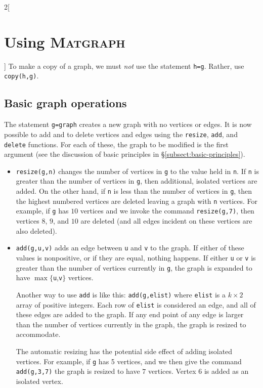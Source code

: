 \documentclass{amsart}
\newcommand\matgraph{\textsc{Matgraph}}
\begin{document}
\begin{multicols}{2}[\section{Using \matgraph}]
To make a copy of a graph, we must \emph{not} use the statement
\verb|h=g|. Rather, use \verb|copy(h,g)|. 




\subsection{Basic graph operations}

The statement \verb|g=graph| creates a new graph with no vertices or
edges. It is now possible to add and to delete vertices and edges
using the \verb|resize|, \verb|add|, and \verb|delete| functions.  For
each of these, the graph to be modified is the first argument (see the
discussion of basic principles in \S\ref{subsect:basic-principles}).

\begin{itemize}
\item \verb|resize(g,n)| changes the number of vertices in \verb|g| to
  the value held in \verb|n|. If \verb|n| is greater than the number
  of vertices in \verb|g|, then additional, isolated vertices are
  added. On the other hand, if \verb|n| is less than the number of
  vertices in \verb|g|, then the highest numbered vertices are deleted
  leaving a graph with \verb|n| vertices. For example, if \verb|g| has
  $10$ vertices and we invoke the command \verb|resize(g,7)|, then
  vertices $8$, $9$, and $10$ are deleted (and all edges incident on
  these vertices are also deleted). 

\item \verb|add(g,u,v)| adds an edge between \verb|u| and \verb|v| to
  the graph. If either of these values is nonpositive, or if they are
  equal, nothing happens. If either \verb|u| or \verb|v| is greater
  than the number of vertices currently in \verb|g|, the graph is
  expanded to have $\max\{$\verb|u|,\verb|v|$\}$ vertices. 
  
  Another way to use \verb|add| is like this: \verb|add(g,elist)|
  where \verb|elist| is a $k\times 2$ array of positive integers. Each
  row of \verb|elist| is considered an edge, and all of these edges
  are added to the graph. If any end point of any edge is larger than
  the number of vertices currently in the graph, the graph is resized
  to accommodate.

  The automatic resizing has the potential side effect of adding
  isolated vertices. For example, if \verb|g| has 5 vertices, and we
  then give the command \verb|add(g,3,7)| the graph is resized to have
  $7$ vertices. Vertex $6$ is added as an isolated vertex.
  

\end{itemize}
\end{multicols}
\end{document}
